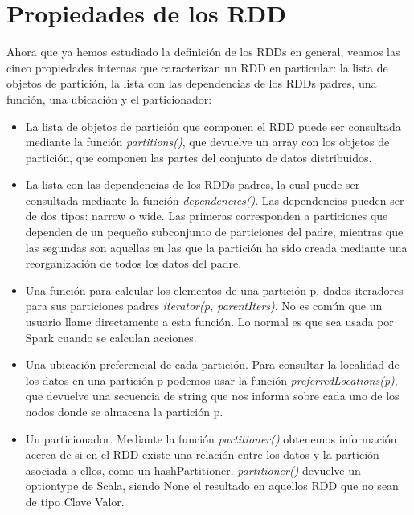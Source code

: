 \section{Propiedades de los RDD}
Ahora que ya hemos estudiado la definición de los RDDs en general, veamos las cinco propiedades internas \cite{SCoockbook} que caracterizan un RDD en particular: la lista de objetos de partición, la lista con las dependencias de los RDDs padres, una función, una ubicación y el particionador:\\

\begin{itemize}
\item La lista de objetos de partición que componen el RDD puede ser consultada mediante la función \textit{partitions()}, que devuelve un array con los objetos de partición, que componen las partes del conjunto de datos distribuidos.
 
\item La lista con las dependencias de los RDDs padres, la cual puede ser consultada mediante la función \textit{dependencies()}. Las dependencias pueden ser de dos tipos: narrow o wide. Las primeras corresponden a particiones que dependen de un pequeño subconjunto de particiones del padre, mientras que las segundas son aquellas en las que la partición ha sido creada mediante una reorganización de todos los datos del padre.
 
\item Una función para calcular los elementos de una partición p, dados iteradores para sus particiones padres \textit{iterator(p, parentIters)}. No es común que un usuario llame directamente a esta función. Lo normal es que sea usada por Spark cuando se calculan acciones.
 
\item Una ubicación preferencial de cada partición. Para consultar la localidad de los datos en una partición p podemos usar la función \textit{preferredLocations(p)}, que devuelve una secuencia de string que nos informa sobre cada uno de los nodos donde se almacena la partición p.
 
\item Un particionador. Mediante la función \textit{partitioner()} obtenemos información acerca de si en el  RDD existe una relación entre los datos y la partición asociada a ellos, como un hashPartitioner. \textit{partitioner()} devuelve un optiontype de Scala, siendo None el resultado en aquellos RDD que no sean de tipo Clave Valor.

\end{itemize}

